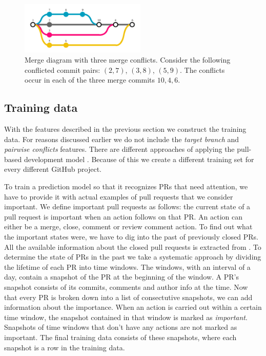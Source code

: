 \begin{description}
\begin{figure}
  \centering
  \includegraphics[height=25mm, clip ,trim = 0mm 7mm 0mm 7mm]{../figs/conflicts-3.pdf}
  \caption[Merge diagram with three merge conflicts]
   {Merge diagram with three merge conflicts.
   Consider the following conflicted commit pairs: $(2,7)$, $(3,8)$, $(5,9)$.
   The conflicts occur in each of the three merge commits $10,4,6$.}
  \label{fig:conflicts-3}
\end{figure}

\end{description}

\subsection{Training data}
\label{sec:training}

With the features described in the previous section we construct the training data.
For reasons discussed earlier we do not include the \emph{target branch} and \emph{pairwise conflicts} features.
There are different approaches of applying the pull-based development model \cite{GPD14}.
Because of this we create a different training set for every different GitHub project.

To train a prediction model so that it recognizes PRs that need attention, we have to provide it with actual examples of pull requests that we consider important.
We define important pull requests as follows: the current state of a pull request is important when an action follows on that PR.
An action can either be a merge, close, comment or review comment action.
To find out what the important states were, we have to dig into the past of previously closed PRs.
All the available information about the closed pull requests is extracted from \ghtorrent.
To determine the state of PRs in the past we take a systematic approach by dividing the lifetime of each PR into time windows.
The windows, with an interval of a day, contain a snapshot of the PR at the beginning of the window.
A PR's snapshot consists of its commits, comments and author info at the time.
Now that every PR is broken down into a list of consectutive snapshots, we can add information about the importance.
When an action is carried out within a certain time window, the snapshot contained in that window is marked as \emph{important}.
Snapshots of time windows that don't have any actions are not marked as important.
The final training data consists of these snapshots, where each snapshot is a row in the training data.

